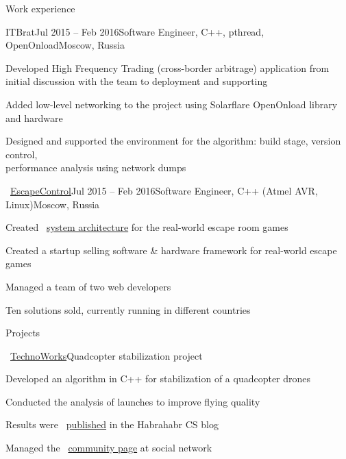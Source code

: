 \documentclass{resume} %
\begin{document}
\begin{rSection}{Work experience}
\begin{rSubsection}{ITBrat}{Jul 2015 -- Feb 2016}{Software Engineer, C++, pthread, OpenOnload}{Moscow, Russia}
	\item Developed High Frequency Trading (cross-border arbitrage) application from initial discussion with the team to deployment and supporting
	\item Added low-level networking to the project using Solarflare OpenOnload library and hardware
	\item Designed and supported the environment for the algorithm: build stage, version control,\\ performance analysis using network dumps
\end{rSubsection}
	
\begin{rSubsection}{\faExternalLink~\href{http://escapecontrol.ru/index_en.html}{EscapeControl}}{Jul 2015 -- Feb 2016}{Software Engineer, C++ (Atmel AVR, Linux)}{Moscow, Russia}
	\item Created \faExternalLink~\href{http://habr.ru/p/258585/}{system architecture} for the real-world escape room games
	\item Created a startup selling software \& hardware framework for real-world escape games
	\item Managed a team of two web developers
	\item Ten solutions sold, currently running in different countries
\end{rSubsection}
		
\end{rSection}

\begin{rSection}{Projects}
\begin{rSubsection}{\faExternalLink~\href{http://web.archive.org/web/20150626102512/http://technoworks.ru:80/}{TechnoWorks}}{}{Quadcopter stabilization project}{}
\item Developed an algorithm in C++ for stabilization of a quadcopter drones
\item Conducted the analysis of launches to improve flying quality
\item Results were \faExternalLink~\href{http://web.archive.org/web/20141016114551/http://habrahabr.ru/company/technoworks/blog/216437/}{published} in the Habrahabr CS blog
\item Managed the \faExternalLink~\href{https://vk.com/technoworks}{community page} at social network
\end{rSubsection}
\end{rSection}
\end{document}
